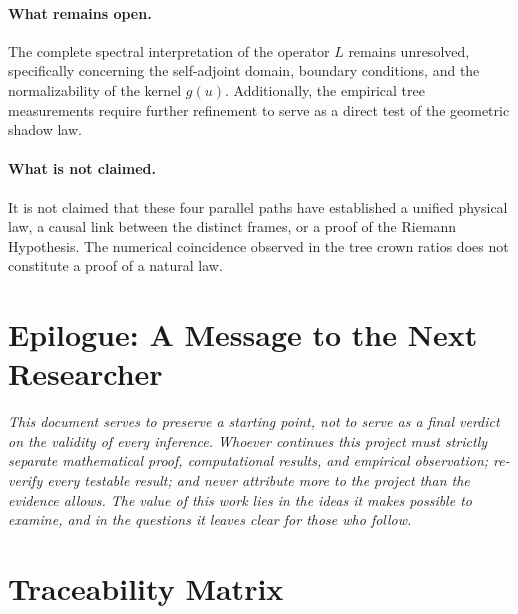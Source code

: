 \documentclass[11pt,a4paper]{article}
\begin{document}
\paragraph{What remains open.}
The complete spectral interpretation of the operator \(L\) remains unresolved, specifically concerning the self-adjoint domain, boundary conditions, and the normalizability of the kernel \(g(u)\). Additionally, the empirical tree measurements require further refinement to serve as a direct test of the geometric shadow law.

\paragraph{What is not claimed.}
It is not claimed that these four parallel paths have established a unified physical law, a causal link between the distinct frames, or a proof of the Riemann Hypothesis. The numerical coincidence observed in the tree crown ratios does not constitute a proof of a natural law.

\section*{Epilogue: A Message to the Next Researcher}
\label{sec:epilogue}

\textit{This document serves to preserve a starting point, not to serve as a final verdict on the validity of every inference. Whoever continues this project must strictly separate mathematical proof, computational results, and empirical observation; re-verify every testable result; and never attribute more to the project than the evidence allows. The value of this work lies in the ideas it makes possible to examine, and in the questions it leaves clear for those who follow.}

\appendix
\section{Traceability Matrix}
\label{app:audit}
\end{document}
